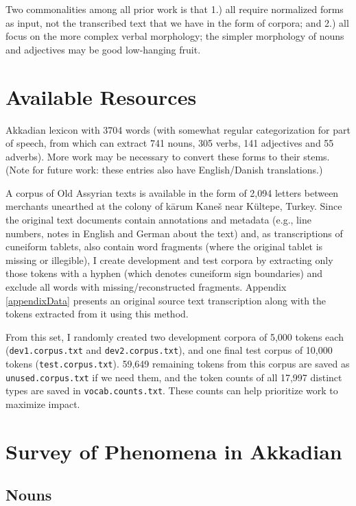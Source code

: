 \documentclass[11pt,letterpaper]{article}
\begin{document}
Two commonalities among all prior work is that 1.) all require normalized forms as input, not the transcribed text that we have in the form of corpora; and 2.) all focus on the more complex verbal morphology; the simpler morphology of nouns and adjectives may be good low-hanging fruit.

\section{Available Resources}
\label{resources}

Akkadian lexicon with 3704 words (with somewhat regular categorization for part of speech, from which can extract 741 nouns, 305 verbs, 141 adjectives and 55 adverbs).  More work may be necessary to convert these forms to their stems. (Note for future work: these entries also have English/Danish translations.)

A corpus of Old Assyrian texts is available in the form of 2,094 letters between merchants unearthed at the colony of kārum Kaneš near K\"ultepe, Turkey.  Since the original text documents contain annotations and metadata (e.g., line numbers, notes in English and German about the text) and, as transcriptions of cuneiform tablets, also contain word fragments (where the original tablet is missing or illegible), I create development and test corpora by extracting only those tokens with a hyphen (which denotes cuneiform sign boundaries) and exclude all words with missing/reconstructed fragments.  Appendix \ref{appendixData} presents an original source text transcription along with the tokens extracted from it using this method.

From this set, I randomly created two development corpora of 5,000 tokens each (\texttt{dev1.corpus.txt} and \texttt{dev2.corpus.txt}), and one final test corpus of 10,000 tokens (\texttt{test.corpus.txt}).  59,649 remaining tokens from this corpus are saved as \texttt{unused.corpus.txt} if we need them, and the token counts of all 17,997 distinct types are saved in \texttt{vocab.counts.txt}.  These counts can help prioritize work to maximize impact.

\section{Survey of Phenomena in Akkadian}

\subsection{Nouns}
\end{document}
